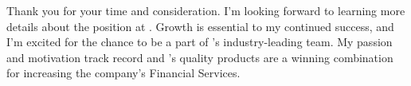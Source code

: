 



Thank you for your time and consideration. I'm looking forward to learning more details about the \position\;position at \company. Growth is essential to my continued success, and I'm excited for the chance to be a part of \company's industry-leading team. My passion and motivation track record and \company's quality products are a winning combination for increasing the company's Financial Services.

